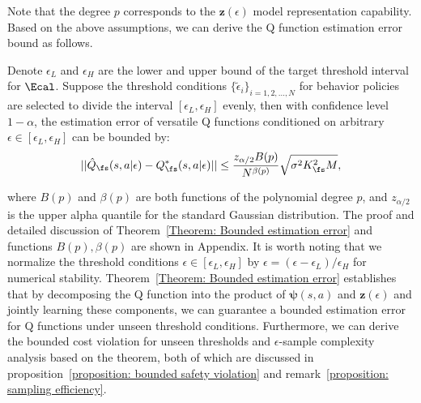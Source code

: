 Note that the degree $p$ corresponds to the $\boldsymbol{z}(\epsilon)$ model representation capability. Based on the above assumptions, we can derive the Q function estimation error bound as follows.
\begin{Theorem}
\label{Theorem: Bounded estimation error}
Denote $\epsilon_L$ and $\epsilon_H$ are the lower and upper bound of the target threshold interval for $\Ecal$. Suppose the threshold conditions $\{\tilde{\epsilon}_i\}_{i=1, 2, ..., N}$ for behavior policies are selected to divide the interval $[\epsilon_L, \epsilon_H]$ evenly, then with confidence level $1-\alpha$, the estimation error of versatile Q functions conditioned on arbitrary $\epsilon \in [\epsilon_L, \epsilon_H]$ can be bounded by:
\begin{equation}
    ||\hat{Q}_\fs(s, a|\epsilon) - Q_\fs^*(s, a|\epsilon)|| \leq 
 \frac{z_{\alpha/2} B(p)}{N^{\beta(p)}}  \sqrt{ \sigma^2 K_\fs^2 M },
\end{equation}
\end{Theorem}
where $B(p)$ and $\beta(p)$ are both functions of the polynomial degree $p$, and $z_{\alpha / 2}$ is the upper alpha quantile for the standard Gaussian distribution. The proof and detailed discussion of Theorem~\ref{Theorem: Bounded estimation error} and functions $B(p), \beta(p)$ are shown in Appendix. It is worth noting that we normalize the threshold conditions $\epsilon \in [\epsilon_L, \epsilon_H]$ by $\epsilon = (\epsilon - \epsilon_L) / \epsilon_H$ for numerical stability. Theorem~\ref{Theorem: Bounded estimation error} establishes that by decomposing the Q function into the product of $\boldsymbol{\psi}(s,a)$ and $\boldsymbol{z}(\epsilon)$ and jointly learning these components, we can guarantee a bounded estimation error for Q functions under unseen threshold conditions. Furthermore, we can derive the bounded cost violation for unseen thresholds and $\epsilon$-sample complexity analysis based on the theorem, both of which are discussed in proposition~\ref{proposition: bounded safety violation} and remark~\ref{proposition: sampling efficiency}. 


